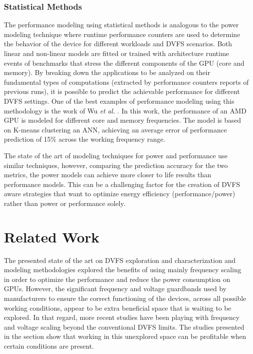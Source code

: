 \subsubsection{Statistical Methods}
The performance modeling using statistical methods is analogous to the power modeling technique where runtime performance counters are used to determine the behavior of the device for different workloads and DVFS scenarios. Both linear and non-linear models are fitted or trained with architecture runtime events of benchmarks that stress the different components of the GPU (core and memory). By breaking down the applications to be analyzed on their fundamental types of computations (extracted by performance counters reports of previous runs), it is possible to predict the achievable performance for different DVFS settings. One of the best examples of performance modeling using this methodology is the work of Wu \textit{et al.} \cite{wu_gpgpu_2015}. In this work, the performance of an AMD GPU is modeled for different core and memory frequencies. The model is based on K-means clustering an ANN, achieving an average error of performance prediction of 15\% across the working frequency range.

The state of the art of modeling techniques for power and performance use similar techniques, however, comparing the prediction accuracy for the two metrics, the power models can achieve more closer to life results than performance models. This can be a challenging factor for the creation of DVFS aware strategies that want to optimize energy efficiency (performance/power) rather than power or performance solely.

\section{Related Work}

The presented state of the art on DVFS exploration and characterization and modeling methodologies explored the benefits of using mainly frequency scaling in order to optimize the performance and reduce the power consumption on GPUs. However, the significant frequency and voltage guardbands used by manufacturers to ensure the correct functioning of the devices, across all possible working conditions, appear to be extra beneficial space that is waiting to be explored.  In that regard, more recent studies have been playing with frequency and voltage scaling beyond the conventional DVFS limits. The studies presented in the section show that working in this unexplored space can be profitable when certain conditions are present.


